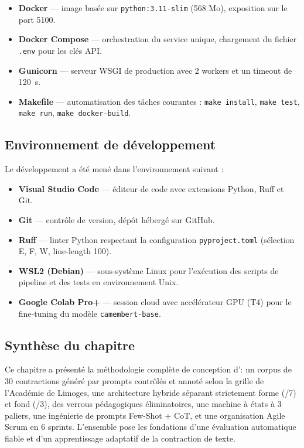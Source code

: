 \begin{itemize}
    \item \textbf{Docker} — image basée sur \texttt{python:3.11-slim} (568 Mo), exposition sur le port 5100.
    \item \textbf{Docker Compose} — orchestration du service unique, chargement du fichier \texttt{.env} pour les clés API.
    \item \textbf{Gunicorn} — serveur WSGI de production avec 2 workers et un timeout de 120~s.
    \item \textbf{Makefile} — automatisation des tâches courantes : \texttt{make install}, \texttt{make test}, \texttt{make run}, \texttt{make docker-build}.
\end{itemize}

\subsection{Environnement de développement}

Le développement a été mené dans l'environnement suivant :

\begin{itemize}
    \item \textbf{Visual Studio Code} — éditeur de code avec extensions Python, Ruff et Git.
    \item \textbf{Git} — contrôle de version, dépôt hébergé sur GitHub.
    \item \textbf{Ruff} — linter Python respectant la configuration \texttt{pyproject.toml} (sélection E, F, W, line-length 100).
    \item \textbf{WSL2 (Debian)} — sous-système Linux pour l'exécution des scripts de pipeline et des tests en environnement Unix.
    \item \textbf{Google Colab Pro+} — session cloud avec accélérateur GPU (T4) pour le fine-tuning du modèle \texttt{camembert-base}.
\end{itemize}

\subsection*{Synthèse du chapitre}

Ce chapitre a présenté la méthodologie complète de conception d'\AZIZA : un corpus de 30 contractions généré par prompts contrôlés et annoté selon la grille de l'Académie de Limoges, une architecture hybride séparant strictement forme (/7) et fond (/3), des verrous pédagogiques éliminatoires, une machine à états à 3 paliers, une ingénierie de prompts Few-Shot + CoT, et une organisation Agile Scrum en 6 sprints. L'ensemble pose les fondations d'une évaluation automatique fiable et d'un apprentissage adaptatif de la contraction de texte.


